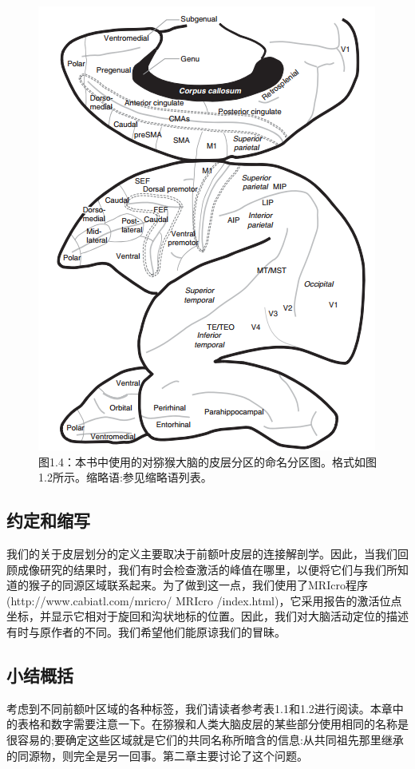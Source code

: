 \begin{figure}[!htb]
	\centering
	\includegraphics[width=0.5\linewidth]{image_pfc/Fig_1_4}
	\caption*{图1.4：本书中使用的对猕猴大脑的皮层分区的命名分区图。格式如图1.2所示。缩略语:参见缩略语列表。}
\end{figure}




\subsection{约定和缩写}
我们的关于皮层划分的定义主要取决于前额叶皮层的连接解剖学。因此，当我们回顾成像研究的结果时，我们有时会检查激活的峰值在哪里，以便将它们与我们所知道的猴子的同源区域联系起来。为了做到这一点，我们使用了MRIcro程序(http://www.cabiatl.com/mricro/ MRIcro /index.html)，它采用报告的激活位点坐标，并显示它相对于旋回和沟状地标的位置。因此，我们对大脑活动定位的描述有时与原作者的不同。我们希望他们能原谅我们的冒昧。

\subsection{小结概括}
考虑到不同前额叶区域的各种标签，我们请读者参考表1.1和1.2进行阅读。本章中的表格和数字需要注意一下。在猕猴和人类大脑皮层的某些部分使用相同的名称是很容易的;要确定这些区域就是它们的共同名称所暗含的信息:从共同祖先那里继承的同源物，则完全是另一回事。第二章主要讨论了这个问题。

